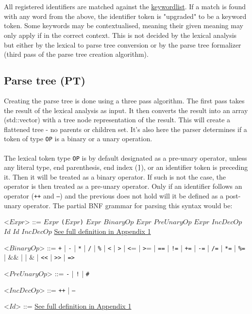 \documentclass{article}
\newcommand{\newsubsection}[1]{
	\phantomsection
	\addcontentsline{toc}{subsection}{#1}
	\subsection*{#1}
}
\newcommand{\gtext}[1]{<$#1$>}
\newcommand{\glit}[1]{\texttt{#1}}
\begin{document}
\\\\
All registered identifiers are matched against the \hyperref[sec:Keywords]{\textsf{keywordlist}}. If a match is found with any word from the above, the identifier token is "upgraded" to be a keyword token. Some keywords may be contextualised, meaning their given meaning may only apply if in the correct context. This is not decided by the lexical analysis but either by the lexical to parse tree conversion or by the parse tree formalizer (third pass of the parse tree creation algorithm).
\newpage
\newsubsection{Parse tree (PT)}
Creating the parse tree is done using a three pass algorithm. The first pass takes the result of the lexical analysis as input. It then converts the result into an array (\textsf{std::vector}) with a tree node representation of the result. This will create a flattened tree - no parents or children set. It's also here the parser determines if a token of type \texttt{OP} is a binary or a unary operation.
\\\\
The lexical token type \texttt{OP} is by default designated as a pre-unary operator, unless any literal type, end parenthesis, end index (\texttt{]}), or an identifier token is preceding it. Then it will be treated as a binary operator. If such is not the case, the operator is then treated as a pre-unary operator. Only if an identifier follows an operator (\texttt{++} and \texttt{--}) and the previous does not hold will it be defined as a post-unary operator. The partial BNF grammar for parsing this syntax would be:
\begin{grammar}
	\gtext{Expr} ::= $Expr$
	\alt \glit{(}$Expr$\glit{)}
	\alt $Expr$ $BinaryOp$ $Expr$
	\alt $PreUnaryOp$ $Expr$
	\alt $IncDecOp$ $Id$
	\alt $Id$ $IncDecOp$
	\alt \hyperref[sec:ap1]{\textsf{See full definition in Appendix 1}}

	\gtext{BinaryOp} ::= \glit{+} | \glit{-} | \glit{*} | \glit{/} | \glit{\%} | \glit{\textless} | \glit{\textgreater} | \glit{\textless}= | \glit{\textgreater}= | \glit{==} | \glit{!=} | \glit{+=} | \glit{-=} | \glit{/=} | \glit{*=} | \glit{\%=}
	\alt \glit{\textbar\textbar} | $\&\&$ | \glit{\textbar} | $\&$ | \glit{\textless\textless} | \glit{\textgreater\textgreater} | \glit{=>}
	
	\gtext{PreUnaryOp} ::= \glit{-} | \glit{!} | \glit{\#}
	
	\gtext{IncDecOp} ::= \glit{++} | \glit{--}

	\gtext{Id} ::= \hyperref[sec:ap1]{\textsf{See full definition in Appendix 1}}

\end{grammar}
\end{document}
